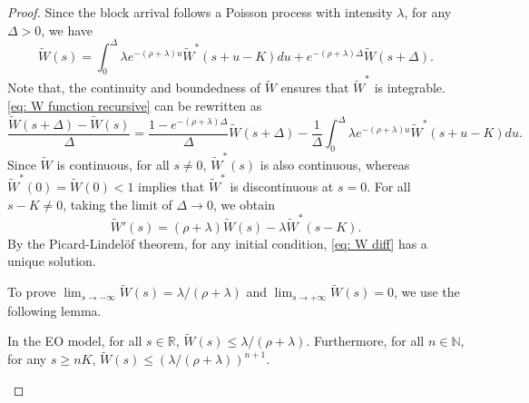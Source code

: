 \documentclass[12pt, letterpaper]{article}
\begin{document}
\begin{proof}
Since the block arrival follows a Poisson process with intensity $\lambda$, for any $\Delta > 0$,  we have
\begin{equation}\label{eq: W function recursive}
    \tilde{W}(s) = \int_0^\Delta \lambda e^{-(\rho + \lambda) u} \tilde{W}^*(s + u - K) du + e^{-(\rho + \lambda) \Delta} \tilde{W}(s + \Delta).
\end{equation}
Note that, the continuity and boundedness of $\tilde{W}$ ensures that $\tilde{W}^*$ is integrable. \eqref{eq: W function recursive} can be rewritten as
\begin{equation}\label{eq: W derivative derivation}
    \frac{\tilde{W}(s+\Delta) - \tilde{W}(s)}{\Delta} = \frac{1 - e^{-(\rho + \lambda)\Delta}}{\Delta} \tilde{W}(s + \Delta ) - \frac{1}{\Delta} \int_0^\Delta \lambda e^{-(\rho+ \lambda) u}\tilde{W}^*(s+ u - K)du.
\end{equation}
Since $\tilde{W}$ is continuous, for all $s \neq 0$, $\tilde{W}^*(s)$ is also continuous, whereas $\tilde{W}^*(0) = \tilde{W}(0) < 1$ implies that $\tilde{W}^*$ is discontinuous at $s = 0$. For all $s-K \neq 0$, taking the limit of $\Delta \to 0$, we obtain
\begin{equation}\label{eq: W diff}
    \tilde{W}'(s) = (\rho + \lambda) \tilde{W}(s) - \lambda \tilde{W}^*(s - K).
\end{equation}
By the Picard-Lindel{\"o}f theorem, for any initial condition, \eqref{eq: W diff} has a unique solution.

To prove $\lim_{s \to - \infty}\tilde{W}(s) = \lambda/(\rho + \lambda)$ and $\lim_{s \to + \infty}\tilde{W}(s) = 0$, we use the following lemma.

\begin{lem}\label{lem: W tilde upper bound}
    In the EO model, for all $s \in \mathbb{R}$, $\tilde{W}(s) \le \lambda/(\rho + \lambda)$. Furthermore, for all $n \in \mathbb{N}$, for any $s \ge nK$, $\tilde{W}(s) \le (\lambda/(\rho + \lambda))^{n + 1}$.
\end{lem}


\end{proof}
\end{document}
